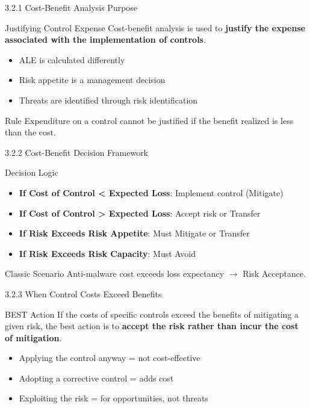 \documentclass{beamer}
\begin{document}
	\begin{frame}{3.2.1 Cost-Benefit Analysis Purpose}
		\begin{block}{Justifying Control Expense}
			Cost-benefit analysis is used to \textbf{justify the expense associated with the implementation of controls}.
		\end{block}
		\begin{itemize}
			\item ALE is calculated differently
			\item Risk appetite is a management decision
			\item Threats are identified through risk identification
		\end{itemize}
		\begin{exampleblock}{Rule}
			Expenditure on a control cannot be justified if the benefit realized is less than the cost.
		\end{exampleblock}
	\end{frame}
	
	\begin{frame}{3.2.2 Cost-Benefit Decision Framework}
		\begin{block}{Decision Logic}
			\begin{itemize}
				\item \textbf{If Cost of Control < Expected Loss}: Implement control (Mitigate)
				\item \textbf{If Cost of Control > Expected Loss}: Accept risk or Transfer
				\item \textbf{If Risk Exceeds Risk Appetite}: Must Mitigate or Transfer
				\item \textbf{If Risk Exceeds Risk Capacity}: Must Avoid
			\end{itemize}
		\end{block}
		\begin{exampleblock}{Classic Scenario}
			Anti-malware cost exceeds loss expectancy $\rightarrow$ Risk Acceptance.
		\end{exampleblock}
	\end{frame}
	
	\begin{frame}{3.2.3 When Control Costs Exceed Benefits}
		\begin{block}{BEST Action}
			If the costs of specific controls exceed the benefits of mitigating a given risk, the best action is to \textbf{accept the risk rather than incur the cost of mitigation}.
		\end{block}
		\begin{itemize}
			\item Applying the control anyway = not cost-effective
			\item Adopting a corrective control = adds cost
			\item Exploiting the risk = for opportunities, not threats
		\end{itemize}
	\end{frame}
	
\end{document}
